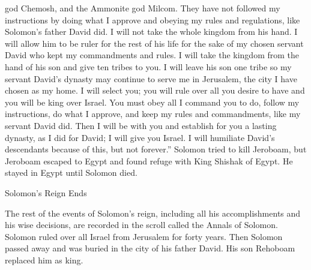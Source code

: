 {god
Chemosh,
and the Ammonite
god
Milcom.
They have not
followed
my instructions
by doing
what I approve
and obeying
my rules
and regulations,
like Solomon’s father
David did.
I will not
take
the
whole
kingdom
from his hand.
I will allow
him to be ruler
for
the rest
of his life
for the sake
of my chosen
servant
David
who
kept
my commandments
and rules.
I will take
the kingdom
from the hand
of his son
and give
ten
tribes to you.
I will leave his son
one
tribe
so
my servant
David’s
dynasty
may continue
to serve
me in Jerusalem,
the city
I have chosen
as my home.
I will select
you; you will rule
over all
you desire
to have and you will be
king
over
Israel.
You must
obey
all
I command
you to do, follow
my instructions,
do
what I approve,
and keep
my rules
and commandments,
like my servant
David
did.
Then I will be
with
you and establish
for you a lasting
dynasty,
as I did
for David;
I will give
you Israel.
I will humiliate
David’s
descendants
because
of this,
but not
forever.”
Solomon
tried
to kill
Jeroboam,
but Jeroboam
escaped
to Egypt
and found refuge with King
Shishak
of Egypt.
He stayed in Egypt
until
Solomon
died.
\par }{\SH Solomon’s Reign Ends
\par }{\PP {}The rest
of the events
of Solomon’s
reign, including all
his accomplishments
and his wise
decisions, are
recorded
in the scroll
called the Annals
of Solomon.
Solomon
ruled
over
all
Israel
from Jerusalem
for forty
years.
Then Solomon
passed away
and was buried
in the city
of his father
David.
His son
Rehoboam
replaced
him as king.

}

